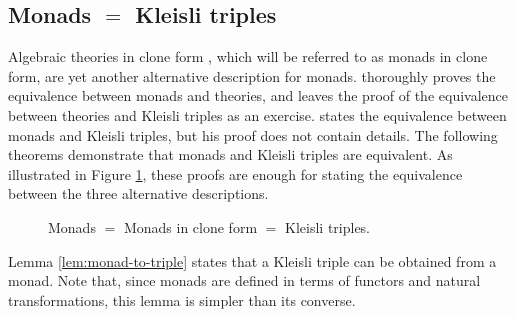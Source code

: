 \subsection*{Monads $=$ Kleisli triples}

Algebraic theories in clone form \parencite[24]{manes-1976}, which
will be referred to as monads in clone form, are yet another
alternative description for monads. \textcite[26--29]{manes-1976}
thoroughly proves the equivalence between monads and theories, and
leaves the proof of the equivalence between theories and Kleisli triples as an
exercise. \textcite[61]{moggi-1991} states the equivalence between
monads and Kleisli triples, but his proof does not contain details. The
following theorems demonstrate that monads and Kleisli triples are equivalent.
As illustrated in Figure \ref{fig:monad-theory-triple}, these proofs
are enough for stating the equivalence between the three alternative
descriptions.

\begin{figure}[htb]
  \begin{center}
  \end{center}
  \caption{Monads $=$ Monads in clone form $=$ Kleisli triples.}
  \label{fig:monad-theory-triple}
\end{figure}

Lemma \ref{lem:monad-to-triple} states that a Kleisli triple can be obtained
from a monad. Note that, since monads are defined in terms of functors
and natural transformations, this lemma is simpler than its converse.

